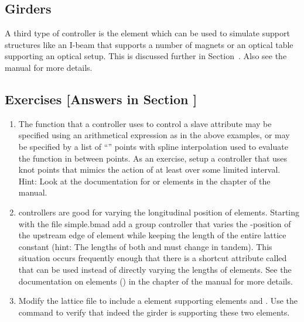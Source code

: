 \documentclass{hitec}     %
\begin{document}
\subsection{Girders}
\label{s:girder}

A third type of controller is the  element which can be used to simulate support
structures like an I-beam that supports a number of magnets or an optical table supporting an
optical setup. This is discussed further in Section~. Also see the \bmad manual for
more details.

\subsection{Exercises [Answers in Section ]}
\label{s:control.ex}

\begin{enumerate}[label=\thesection.\arabic{enumi}]
\item 
The function that a controller uses to control a slave attribute may be specified using an
arithmetical expression as in the above examples, or may be specified by a list of ``''
points with spline interpolation used to evaluate the function in between points.  As an exercise,
setup a controller that uses knot points that mimics the action of  at least over some
limited interval. Hint: Look at the documentation for  or  elements in the
 chapter of the \bmad manual.
%
\item
{} controllers are good for varying the longitudinal position of elements. Starting with the
file simple.bmad add a group controller that varies the -position of the upstream edge of
element  while keeping the length of the entire lattice constant (hint: The lengths of both
 and  must change in tandem). This situation occurs frequently enough that there is a
shortcut attribute called  that can be used instead of directly varying the lengths
of elements. See the documentation on  elements () in the 
chapter of the \bmad manual for more details.
%
\item
Modify the lattice file  to include a  element supporting elements 
and . Use the  command to verify that indeed the girder is supporting these two
elements.
\end{enumerate}
\end{document}
